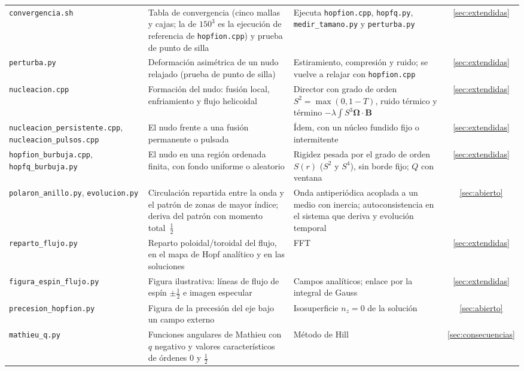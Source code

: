 \documentclass[11pt,a4paper]{article}
\newcommand{\vb}[1]{\symbf{#1}}
\newcommand{\prog}[1]{\texttt{#1}}
\begin{document}
\begin{center}
\begin{tabularx}{\textwidth}{@{}>{\raggedright\arraybackslash}p{} Y Y c@{}}
\addlinespace
\prog{convergencia.sh} & Tabla de convergencia (cinco mallas y cajas; la de $150^3$ es la ejecución de referencia de \prog{hopfion.cpp}) y prueba de punto de silla & Ejecuta \prog{hopfion.cpp}, \prog{hopfq.py}, \prog{medir\_tamano.py} y \prog{perturba.py} & \ref{sec:extendidas} \\
\addlinespace
\prog{perturba.py} & Deformación asimétrica de un nudo relajado (prueba de punto de silla) & Estiramiento, compresión y ruido; se vuelve a relajar con \prog{hopfion.cpp} & \ref{sec:extendidas} \\
\addlinespace
\prog{nucleacion.cpp} & Formación del nudo: fusión local, enfriamiento y flujo helicoidal & Director con grado de orden $S^2=\max(0,1-T)$, ruido térmico y término $-\lambda\!\int S^3\vb{\Omega}\cdot\vb{B}$ & \ref{sec:extendidas} \\
\addlinespace
\prog{nucleacion\_persistente.cpp}, \prog{nucleacion\_pulsos.cpp} & El nudo frente a una fusión permanente o pulsada & Ídem, con un núcleo fundido fijo o intermitente & \ref{sec:extendidas} \\
\addlinespace
\prog{hopfion\_burbuja.cpp}, \prog{hopfq\_burbuja.py} & El nudo en una región ordenada finita, con fondo uniforme o aleatorio & Rigidez pesada por el grado de orden $S(r)$ ($S^2$ y $S^4$), sin borde fijo; $Q$ con ventana & \ref{sec:extendidas} \\
\prog{polaron\_anillo.py}, \prog{evolucion.py} & Circulación repartida entre la onda y el patrón de zonas de mayor índice; deriva del patrón con momento total~$\tfrac12$ & Onda antiperiódica acoplada a un medio con inercia; autoconsistencia en el sistema que deriva y evolución temporal & \ref{sec:abierto} \\
\addlinespace
\prog{reparto\_flujo.py} & Reparto poloidal/toroidal del flujo, en el mapa de Hopf analítico y en las soluciones & FFT & \ref{sec:extendidas} \\
\addlinespace
\prog{figura\_espin\_flujo.py} & Figura ilustrativa: líneas de flujo de espín $\pm\tfrac12$ e imagen especular & Campos analíticos; enlace por la integral de Gauss & \ref{sec:extendidas} \\
\addlinespace
\prog{precesion\_hopfion.py} & Figura de la precesión del eje bajo un campo externo & Isosuperficie $n_z=0$ de la solución & \ref{sec:abierto} \\
\addlinespace
\prog{mathieu\_q.py} & Funciones angulares de Mathieu con $q$ negativo y valores característicos de órdenes $0$ y $\tfrac12$ & Método de Hill & \ref{sec:consecuencias} \\
\bottomrule
\end{tabularx}
\end{center}
\end{document}
